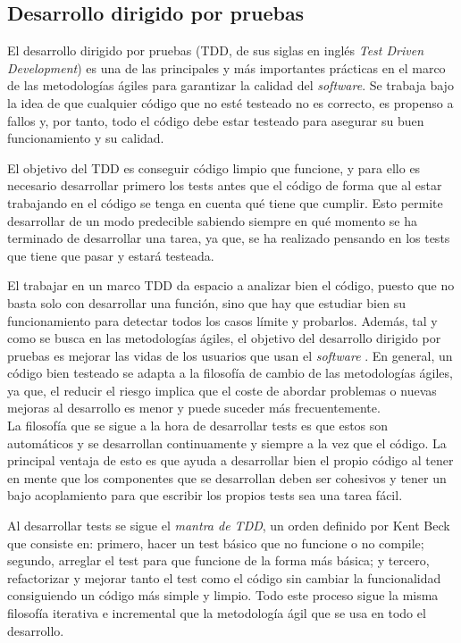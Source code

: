 \subsection{Desarrollo dirigido por pruebas}
El desarrollo dirigido por pruebas (TDD, de sus siglas en inglés \textit{Test
Driven Development}) es una de las principales y más importantes prácticas en el
marco de las metodologías ágiles para garantizar la calidad del
\textit{software}. Se trabaja bajo la idea de que cualquier código que no esté
testeado no es correcto, es propenso a fallos y, por tanto, todo el código debe
estar testeado para asegurar su buen funcionamiento y su calidad.

El objetivo del TDD es conseguir código limpio que funcione, y para ello es
necesario desarrollar primero los tests antes que el código de forma que al
estar trabajando en el código se tenga en cuenta qué tiene que cumplir. Esto
permite desarrollar de un modo predecible sabiendo siempre en qué momento se ha
terminado de desarrollar una tarea, ya que, se ha realizado pensando en los
tests que tiene que pasar y estará testeada. 

El trabajar en un marco TDD da espacio a analizar bien el código, puesto que no
basta solo con desarrollar una función, sino que hay que estudiar bien su
funcionamiento para detectar todos los casos límite y probarlos. Además, tal y
como se busca en las metodologías ágiles, el objetivo del desarrollo dirigido
por pruebas es mejorar las vidas de los usuarios que usan el \textit{software}
\cite{beck2002driven}. En general, un código bien testeado se adapta a la
filosofía de cambio de las metodologías ágiles, ya que, el reducir el riesgo
implica que el coste de abordar problemas o nuevas mejoras al desarrollo es
menor y puede suceder más frecuentemente.\\

La filosofía que se sigue a la hora de desarrollar tests es que estos son
automáticos y se desarrollan continuamente y siempre a la vez que el código. La
principal ventaja de esto es que ayuda a desarrollar bien el propio código al
tener en mente que los componentes que se desarrollan deben ser cohesivos y
tener un bajo acoplamiento para que escribir los propios tests sea una tarea
fácil.

Al desarrollar tests se sigue el \textit{mantra de TDD}, un orden definido por
Kent Beck \cite{beck2002driven} que consiste en: primero, hacer un test básico
que no funcione o no compile; segundo, arreglar el test para que funcione de la
forma más básica; y tercero, refactorizar y mejorar tanto el test como el código
sin cambiar la funcionalidad consiguiendo un código más simple y limpio. Todo
este proceso sigue la misma filosofía iterativa e incremental que la metodología
ágil que se usa en todo el desarrollo.\\

